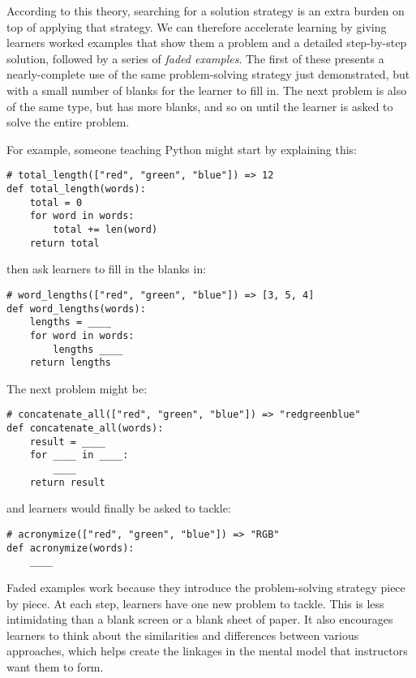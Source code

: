 According to this theory, searching for a solution strategy is an
extra burden on top of applying that strategy. We can therefore
accelerate learning by giving learners worked examples that show them
a problem and a detailed step-by-step solution, followed by a series
of \emph{faded examples}. The first of these presents a
nearly-complete use of the same problem-solving strategy just
demonstrated, but with a small number of blanks for the learner to
fill in. The next problem is also of the same type, but has more
blanks, and so on until the learner is asked to solve the entire
problem.

For example, someone teaching Python might start by explaining this:

\begin{verbatim}
# total_length(["red", "green", "blue"]) => 12
def total_length(words):
    total = 0
    for word in words:
        total += len(word)
    return total
\end{verbatim}

\noindent
then ask learners to fill in the blanks in:

\begin{verbatim}
# word_lengths(["red", "green", "blue"]) => [3, 5, 4]
def word_lengths(words):
    lengths = ____
    for word in words:
        lengths ____
    return lengths
\end{verbatim}

The next problem might be:

\begin{verbatim}
# concatenate_all(["red", "green", "blue"]) => "redgreenblue"
def concatenate_all(words):
    result = ____
    for ____ in ____:
        ____
    return result
\end{verbatim}

\noindent
and learners would finally be asked to tackle:

\begin{verbatim}
# acronymize(["red", "green", "blue"]) => "RGB"
def acronymize(words):
    ____
\end{verbatim}

Faded examples work because they introduce the problem-solving
strategy piece by piece. At each step, learners have one new problem
to tackle.  This is less intimidating than a blank screen or a blank
sheet of paper.  It also encourages learners to think about the
similarities and differences between various approaches, which helps
create the linkages in the mental model that instructors want them to
form.


